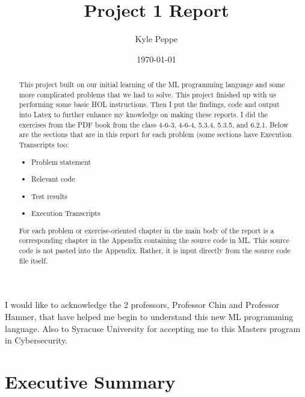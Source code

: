 \documentclass{report}
\title{Project 1 Report}
\author{Kyle Peppe}
\date{\today}
\begin{document}
\lstset{language=ML}


\maketitle{}

\begin{abstract}
  This project built on our initial learning of the ML programming
  language and some more complicated problems that we had to
  solve. This project finished up with us performing some basic HOL
  instructions. Then I put the findings, code and output into Latex to
  further enhance my knowledge on making these reports. I did the
  exercises from the PDF book from the class 4-6-3, 4-6-4, 5.3.4,
  5.3.5, and 6.2.1. Below are the sections that are in this report for
  each problem (some sections have Execution Transcripts too:
  \begin{itemize}
  \item Problem statement
  \item Relevant code
  \item Test results
  \item Execution Transcripts
  \end{itemize}
  
  For each problem or exercise-oriented chapter in the main body of
  the report is a corresponding chapter in the Appendix containing the
  source code in ML.  This source code is not pasted into the
  Appendix.  Rather, it is input directly from the source code file
  itself.

\end{abstract}

\begin{acknowledgments}
  I would like to acknowledge the 2 professors, Professor Chin and 
  Professor Hamner, that have helped me begin to understand this new
  ML programming language. Also to Syracuse University for accepting
  me to this Masters program in Cybersecurity.
\end{acknowledgments}

\tableofcontents{}


\chapter{Executive Summary}
\label{cha:executive-summary}
\end{document}
